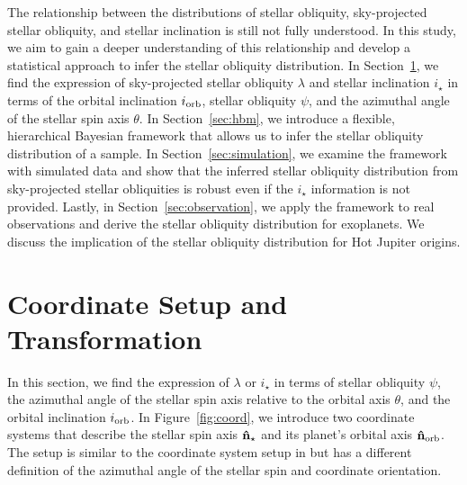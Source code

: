 \documentclass[twocolumn,times,linenumbers]{aastex631}
\begin{document}
The relationship between the distributions of stellar obliquity, sky-projected stellar obliquity, and stellar inclination is still not fully understood. In this study, we aim to gain a deeper understanding of this relationship and develop a statistical approach to infer the stellar obliquity distribution.
In Section~\ref{sec:coords}, we find the expression of sky-projected stellar obliquity $\lambda$ and stellar inclination $i_\star$ in terms of the orbital inclination $i_{\rm orb}$, stellar obliquity $\psi$, and the azimuthal angle of the stellar spin axis $\theta$.
In Section~\ref{sec:hbm}, we introduce a flexible, hierarchical Bayesian framework that allows us to infer the stellar obliquity distribution of a sample.
In Section~\ref{sec:simulation}, we examine the framework with simulated data and show that the inferred stellar obliquity distribution from sky-projected stellar obliquities is robust even if the $i_\star$ information is not provided.
Lastly, in Section~\ref{sec:observation}, we apply the framework to real observations and derive the stellar obliquity distribution for exoplanets. We discuss the implication of the stellar obliquity distribution for Hot Jupiter origins.

\section{Coordinate Setup and Transformation}\label{sec:coords}

In this section, we find the expression of $\lambda$ or $i_\star$ in terms of stellar obliquity $\psi$, the azimuthal angle of the stellar spin axis relative to the orbital axis $\theta$, and the orbital inclination $i_{\rm orb}$. In Figure~\ref{fig:coord}, we introduce two coordinate systems that describe the stellar spin axis $\vb{\hat{n}_\star}$ and its planet's orbital axis $\vb{\hat{n}_{\rm orb}}$. The setup is similar to the coordinate system setup in \cite{Fabrycky09} but has a different definition of the azimuthal angle of the stellar spin and coordinate orientation.
\end{document}
